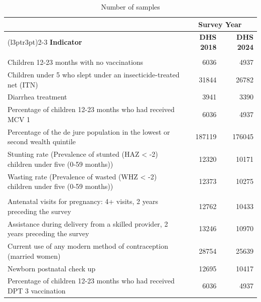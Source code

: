 \documentclass[
]{article}
\begin{document}
\begin{table}[!h]
\centering
\caption{\label{tab:unnamed-chunk-8}Number of samples}
\centering
\begin{tabular}[t]{lrr}
\toprule
\multicolumn{1}{c}{ } & \multicolumn{2}{c}{Survey Year} \\
\cmidrule(l{3pt}r{3pt}){2-3}
\textbf{Indicator} & \textbf{DHS 2018} & \textbf{DHS 2024}\\
\midrule
\addlinespace[0.3em]
\multicolumn{3}{l}{\textbf{Child Health}}\\
\hspace{1em}Children 12-23 months with no vaccinations & 6036 & 4937\\
\hspace{1em}Children under 5 who slept under an insecticide-treated net (ITN) & 31844 & 26782\\
\hspace{1em}Diarrhea treatment & 3941 & 3390\\
\hspace{1em}Percentage of children 12-23 months who had received MCV 1 & 6036 & 4937\\
\hspace{1em}Percentage of the de jure population in the lowest or second wealth quintile & 187119 & 176045\\
\hspace{1em}Stunting rate (Prevalence of stunted (HAZ < -2) children under five (0-59 months)) & 12320 & 10171\\
\hspace{1em}Wasting rate (Prevalence of wasted (WHZ < -2) children under five (0-59 months)) & 12373 & 10275\\
\addlinespace[0.3em]
\multicolumn{3}{l}{\textbf{Maternal Health}}\\
\hspace{1em}Antenatal visits for pregnancy: 4+ visits, 2 years preceding the survey & 12762 & 10433\\
\hspace{1em}Assistance during delivery from a skilled provider, 2 years preceding the survey & 13246 & 10970\\
\hspace{1em}Current use of any modern method of contraception (married women) & 28754 & 25639\\
\hspace{1em}Newborn postnatal check up & 12695 & 10417\\
\hspace{1em}Percentage of children 12-23 months who had received DPT 3 vaccination & 6036 & 4937\\

\end{tabular}
\end{table}
\end{document}
